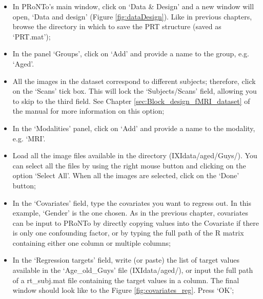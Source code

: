 \begin{itemize}
	
	\item In PRoNTo's main window, click on `Data \& Design' 
	and a new window will open, `Data and design' (Figure \ref{fig:dataDesign}). Like in previous chapters, browse the directory in which to save the PRT structure (saved as `PRT.mat'); 
	
	\item In the panel ‘Groups’, click on ‘Add’ and provide a name to the group, e.g. `Aged'. 
	
	\item All the images in the dataset correspond to different subjects; therefore, click on the ‘Scans’ tick box. This will lock the ‘Subjects/Scans’ field, allowing you to skip to the third field. See Chapter \ref{sec:Block_design_fMRI_dataset} of the manual for more information on this option; 
	
	\item In the `Modalities' panel, click on `Add' and provide a name to the modality, e.g. `MRI'.
	
	\item Load all the image files available in the directory (IXIdata/aged/Guys/). You can select all the files by using the right mouse button and clicking on the option `Select All'. When all the images are selected, click on the `Done' button;
	
	\item In the `Covariates' field, type the covariates you want to regress out. In this example, `Gender' is the one chosen. As in the previous chapter, covariates can be input to PRoNTo by directly copying values into the Covariate if there is only one confounding factor, or by typing the full path of the R matrix containing either one column or multiple columns;
	
	\item In the `Regression targets' field, write (or paste) the list of target values available in the `Age\_old\_Guys' file (IXIdata/aged/), or input the full path of a rt\_subj.mat file containing the target values in a column. The final window should look like to the Figure \ref{fig:covariates_reg}. Press `OK'; 
	

\end{itemize}
